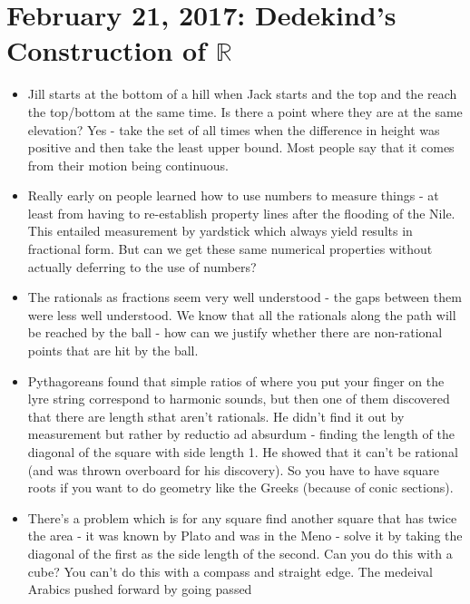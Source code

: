 \documentclass[12pt]{article}
\theoremstyle{definition}
\begin{document}
\section{February 21, 2017: Dedekind's Construction of $\mathbb{R}$}

\begin{itemize}
    \itemsep0em 
    \item  
        Jill starts at the bottom of a hill when Jack starts and the top and
        the reach the top/bottom at the same time. Is there a point where they
        are at the same elevation? Yes - take the set of all times when the
        difference in height was positive and then take the least upper bound.
        Most people say that it comes from their motion being continuous.
    \item
        Really early on people learned how to use numbers to measure things -
        at least from having to re-establish property lines after the flooding
        of the Nile. This entailed measurement by yardstick which always yield
        results in fractional form. But can we get these same numerical
        properties without actually deferring to the use of numbers? 
    \item
        The rationals as fractions seem very well understood - the gaps between
        them were less well understood. We know that all the rationals along
        the path will be reached by the ball - how can we justify whether there
        are non-rational points that are hit by the ball.
    \item
        Pythagoreans found that simple ratios of where you put your finger on
        the lyre string correspond to harmonic sounds, but then one of them
        discovered that there are length sthat aren't rationals. He
        didn't find it out by measurement but rather by reductio ad absurdum -
        finding the length of the diagonal of the square with side length 1. He
        showed that it can't be rational (and was thrown overboard for his
        discovery). So you have to have square roots if you want to do geometry
        like the Greeks (because of conic sections).
    \item
        There's a problem which is for any square find another square that has
        twice the area - it was known by Plato and was in the Meno - solve it
        by taking the diagonal of the first as the side length of the second.
        Can you do this with a cube? You can't do this with a compass and
        straight edge. The medeival Arabics pushed forward by going passed

\end{itemize}
\end{document}

